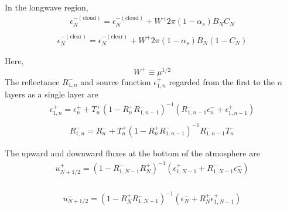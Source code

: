 In the longwave region, \begin{equation}
\begin{array}{l}
\epsilon_{N}^{-(\text {cloud})}=\epsilon_{N}^{-(\text {cloud})}+W^{+} 2 \pi\left(1-\alpha_{s}\right) B_{N} C_{N} \\
\end{array}
\end{equation} \begin{equation}
\begin{array}{l}
\epsilon_{N}^{-(\text {clear})}=\epsilon_{N}^{-(\text {clear})}+W^{+} 2 \pi\left(1-\alpha_{s}\right) B_{N}\left(1-C_{N}\right)
\end{array}
\end{equation}

Here, \begin{equation}
W^{+} \equiv \mu^{1 / 2}
\end{equation} The reflectance \(R_{1, n}^{-}\) and source function
\(\epsilon_{1, n}^{+}\) regarded from the first to the \(n\) layers as a
single layer are \begin{equation}
\begin{array}{l}
\epsilon_{1, n}^{+}=\epsilon_{n}^{+}+T_{n}^{+}\left(1-R_{n}^{+} R_{1, n-1}^{-}\right)^{-1}\left(R_{1, n-1}^{-} \epsilon_{n}^{-}+\epsilon_{1, n-1}^{+}\right) \\
\end{array}
\end{equation} \begin{equation}
\begin{array}{l}
R_{1, n}^{-}=R_{n}^{-}+T_{n}^{+}\left(1-R_{n}^{+} R_{1, n-1}^{-}\right)^{-1} R_{1, n-1}^{-} T_{n}^{-}
\end{array}
\end{equation}

The upward and downward fluxes at the bottom of the atmosphere are \begin{equation}
\begin{array}{l}
u_{N+1 / 2}^{+}=\left(1-R_{1, N-1}^{-} R_{N}^{+}\right)^{-1}\left(\epsilon_{1, N-1}^{+}+R_{1, N-1}^{-} \epsilon_{N}^{-}\right) \\
\end{array}
\end{equation}

\begin{equation}
\begin{array}{l}
u_{N+1 / 2}^{-}=\left(1-R_{N}^{+} R_{1, N-1}^{-}\right)^{-1}\left(\epsilon_{N}^{-}+R_{N}^{+} \epsilon_{1, N-1}^{+}\right)
\end{array}
\end{equation}

